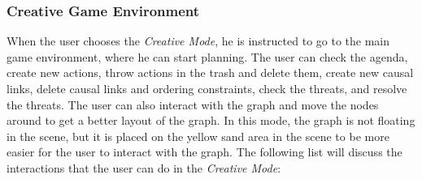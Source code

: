 \subsubsection{Creative Game Environment} \label{subsubsec:creative_game_environment}
When the user chooses the \textit{Creative Mode}, he is instructed to go to the main game environment, where he can start planning. The user can check the agenda, create new actions, throw actions in the trash and delete them, create new causal links, delete causal links and ordering constraints, check the threats, and resolve the threats. The user can also interact with the graph and move the nodes around to get a better layout of the graph. In this mode, the graph is not floating in the scene, but it is placed on the yellow sand area in the scene to be more easier for the user to interact with the graph. The following list will discuss the interactions that the user can do in the \textit{Creative Mode}:

